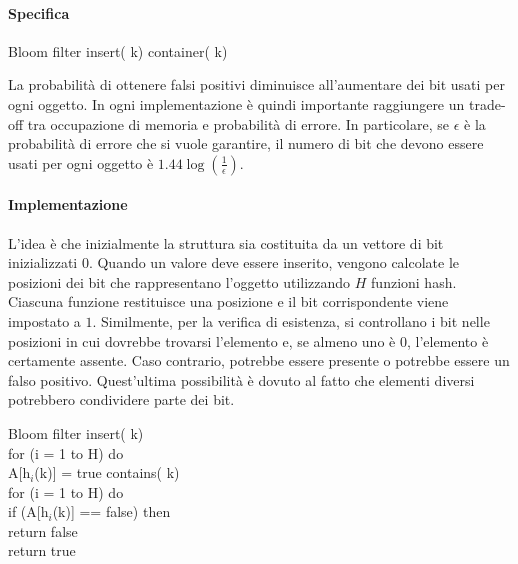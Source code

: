 \paragraph{Specifica}
\begin{code}{Bloom filter}
    insert( k)
    \nl{}
     container( k)
\end{code}

\noindent
La probabilità di ottenere falsi positivi diminuisce all'aumentare dei bit usati
per ogni oggetto. In ogni implementazione è quindi importante raggiungere un
trade-off tra occupazione di memoria e probabilità di errore. In particolare,
se $\epsilon$ è la probabilità di errore che si vuole garantire, il numero di
bit che devono essere usati per ogni oggetto è $1.44\log(\frac{1}{\epsilon})$.

\paragraph{Implementazione}
L'idea è che inizialmente la struttura sia costituita da un vettore di bit
inizializzati $0$. Quando un valore deve essere inserito, vengono calcolate le
posizioni dei bit che rappresentano l'oggetto utilizzando $H$ funzioni hash.
Ciascuna funzione restituisce una posizione e il bit corrispondente viene
impostato a $1$. Similmente, per la verifica di esistenza, si controllano i
bit nelle posizioni in cui dovrebbe trovarsi l'elemento e, se almeno uno è $0$,
l'elemento è certamente assente. Caso contrario, potrebbe essere presente o
potrebbe essere un falso positivo. Quest'ultima possibilità è dovuto al fatto
che elementi diversi potrebbero condividere parte dei bit.

\begin{minicode}{Bloom filter}
\ind insert( k)\\
    \indf for (i = 1 to H) do\\
        A[h$_i$(k)] = true
\nl\ind{} contains( k)\\
    \indf for (i = 1 to H) do\\
        \indff if (A[h$_i$(k)] == false) then\\
            return false\\
    \indf return true
\end{minicode}

